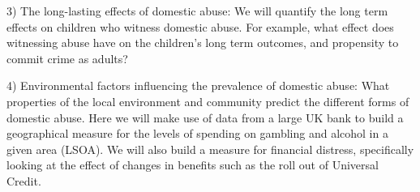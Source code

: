 \documentclass[11pt, a4paper]{article}
\begin{document}
3) The long-lasting effects of domestic abuse: We will quantify the long term effects on children who witness domestic abuse. For example, what effect does witnessing abuse have on the children's long term outcomes, and propensity to commit crime as adults?

4) Environmental factors influencing the prevalence of domestic abuse: What properties of the local environment and community predict the  different forms of domestic abuse. Here we will make use of data from a large UK bank to build a geographical measure for the levels of spending on gambling and alcohol in a given area (LSOA). We will also build a measure for financial distress, specifically looking at the effect of changes in benefits such as the roll out of Universal Credit.
\end{document}
